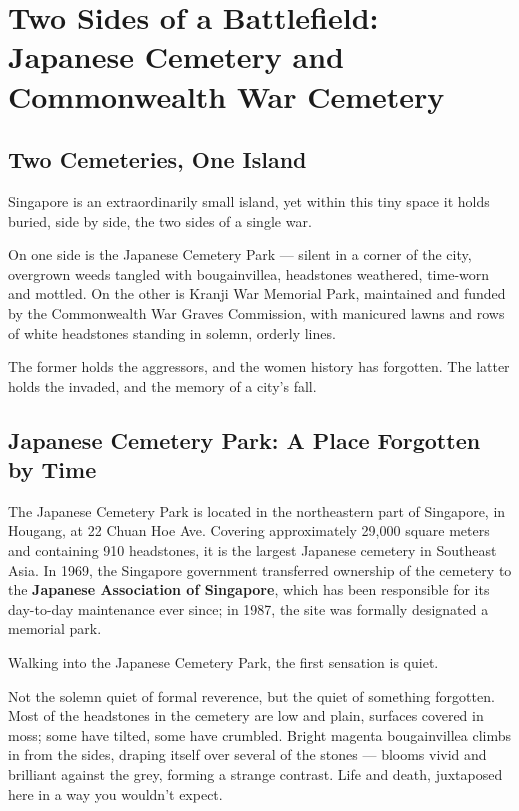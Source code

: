 \chapter{Two Sides of a Battlefield: Japanese Cemetery and Commonwealth War Cemetery}

\section{Two Cemeteries, One Island}

Singapore is an extraordinarily small island, yet within this tiny space it holds buried, side by side, the two sides of a single war.

On one side is the Japanese Cemetery Park --- silent in a corner of the city, overgrown weeds tangled with bougainvillea, headstones weathered, time-worn and mottled. On the other is Kranji War Memorial Park, maintained and funded by the Commonwealth War Graves Commission, with manicured lawns and rows of white headstones standing in solemn, orderly lines.

The former holds the aggressors, and the women history has forgotten. The latter holds the invaded, and the memory of a city's fall.

\section{Japanese Cemetery Park: A Place Forgotten by Time}

The Japanese Cemetery Park is located in the northeastern part of Singapore, in Hougang, at 22 Chuan Hoe Ave. Covering approximately 29,000 square meters and containing 910 headstones, it is the largest Japanese cemetery in Southeast Asia. In 1969, the Singapore government transferred ownership of the cemetery to the \textbf{Japanese Association of Singapore}, which has been responsible for its day-to-day maintenance ever since; in 1987, the site was formally designated a memorial park.

Walking into the Japanese Cemetery Park, the first sensation is quiet.

Not the solemn quiet of formal reverence, but the quiet of something forgotten. Most of the headstones in the cemetery are low and plain, surfaces covered in moss; some have tilted, some have crumbled. Bright magenta bougainvillea climbs in from the sides, draping itself over several of the stones --- blooms vivid and brilliant against the grey, forming a strange contrast. Life and death, juxtaposed here in a way you wouldn't expect.

